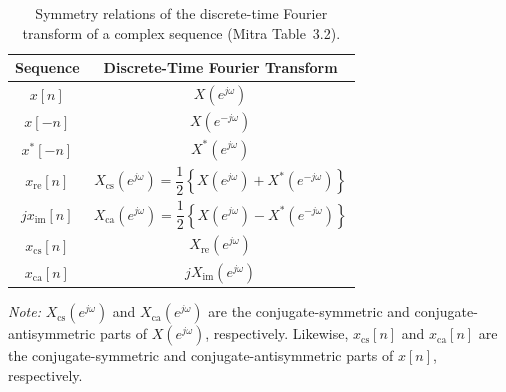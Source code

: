 \begin{table}[H]
\centering
\caption{Symmetry relations of the discrete-time Fourier transform of a complex sequence (Mitra Table~3.2).}
\label{tab:dtft-complex-symmetry}

\begin{tabular}{cc}
\toprule
\textbf{Sequence}
&
\textbf{Discrete-Time Fourier Transform}
\\
\midrule

$x[n]$
&
$X(e^{j\omega})$
\\
\midrule

$x[-n]$
&
$X(e^{-j\omega})$
\\[0.8em]

$x^{*}[-n]$
&
$X^{*}(e^{j\omega})$
\\[0.8em]

$x_{\mathrm{re}}[n]$
&
$X_{\mathrm{cs}}(e^{j\omega})
 =\dfrac{1}{2}
 \left\{
 X(e^{j\omega})+X^{*}(e^{-j\omega})
 \right\}$
\\[0.8em]

$jx_{\mathrm{im}}[n]$
&
$X_{\mathrm{ca}}(e^{j\omega})
 =\dfrac{1}{2}
 \left\{
 X(e^{j\omega})-X^{*}(e^{-j\omega})
 \right\}$
\\[0.8em]

$x_{\mathrm{cs}}[n]$
&
$X_{\mathrm{re}}(e^{j\omega})$
\\[0.8em]

$x_{\mathrm{ca}}[n]$
&
$jX_{\mathrm{im}}(e^{j\omega})$
\\

\bottomrule
\end{tabular}

\medskip

\parbox{0.9\textwidth}{
\textit{Note:}
$X_{\mathrm{cs}}(e^{j\omega})$ and
$X_{\mathrm{ca}}(e^{j\omega})$ are the conjugate-symmetric and
conjugate-antisymmetric parts of $X(e^{j\omega})$, respectively.
Likewise, $x_{\mathrm{cs}}[n]$ and $x_{\mathrm{ca}}[n]$ are the
conjugate-symmetric and conjugate-antisymmetric parts of $x[n]$,
respectively.
}
\end{table}

